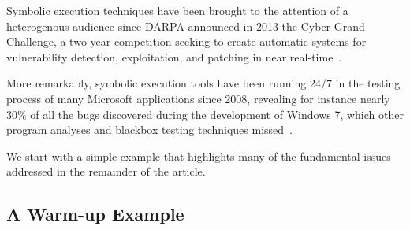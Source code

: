 
Symbolic execution techniques have been brought to the attention of a heterogenous audience since DARPA announced in 2013 the Cyber Grand Challenge, a two-year competition seeking to create automatic systems for vulnerability detection, exploitation, and patching in near real-time~\cite{ANGR-SSP16}.

More remarkably, symbolic execution tools have been running 24/7 in the testing process of many Microsoft applications since 2008, revealing for instance nearly 30\% of all the bugs discovered  during the development of Windows 7, which other program analyses and blackbox testing techniques missed~\cite{SAGE-QUEUE12}.

%
We start with a simple example that highlights many of the fundamental issues addressed in the remainder of the article.

\subsection{A Warm-up Example}
\label{symbolic-execution-example}

